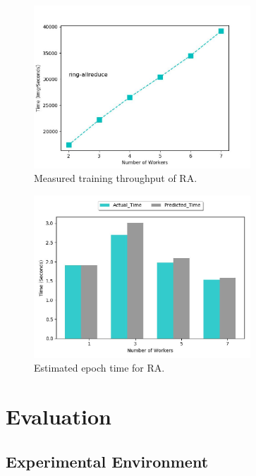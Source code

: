 \documentclass[conference]{IEEEtran}
\begin{document}
\begin{figure}[htb]
  \includegraphics[width=3.2in]{Fig/mpithroughput.jpg}
  \caption{Measured training throughput of RA.}
  \label{fig:mpithroughput}
\end{figure}

\begin{figure}[htb]
  \includegraphics[width=3.2in]{Fig/mpimodel.jpg}
  \caption{Estimated epoch time for RA.}
  \label{fig:mpimodel}
\end{figure}

\section{Evaluation}
\label{sec:eval}
\subsection{Experimental Environment}
\end{document}
